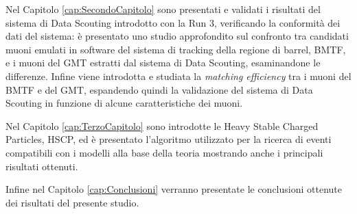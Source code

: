 Nel Capitolo \ref{cap:SecondoCapitolo} sono presentati e validati i risultati del sistema di Data Scouting introdotto con la Run 3, verificando la conformità dei dati del sistema: è presentato uno studio approfondito sul confronto tra candidati muoni emulati in software del sistema di tracking della regione di barrel, BMTF, e i muoni del GMT estratti dal sistema di Data Scouting, esaminandone le differenze. Infine viene introdotta e studiata la \textit{matching efficiency} tra i muoni del BMTF e del GMT, espandendo quindi la validazione del sistema di Data Scouting in funzione di alcune caratteristiche dei muoni.

Nel Capitolo \ref{cap:TerzoCapitolo} sono introdotte le Heavy Stable Charged Particles, HSCP, ed è presentato l'algoritmo utilizzato per la ricerca di eventi compatibili con i modelli alla base della teoria mostrando anche i principali risultati ottenuti.

Infine nel Capitolo \ref{cap:Conclusioni} verranno presentate le conclusioni ottenute dei risultati del presente studio. 

